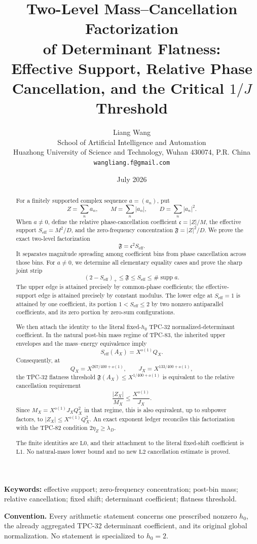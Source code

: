 \documentclass[11pt]{article}
\title{\textbf{Two-Level Mass--Cancellation Factorization}\\
of Determinant Flatness:\\
Effective Support, Relative Phase Cancellation,
and the Critical \(1/J\) Threshold}
\author{Liang Wang\\
School of Artificial Intelligence and Automation\\
Huazhong University of Science and Technology, Wuhan 430074, P.R. China\\
\texttt{wangliang.f@gmail.com}}
\date{July 2026}
\theoremstyle{definition}
\theoremstyle{remark}
\newcommand{\supp}{\operatorname{supp}}
\newcommand{\Seff}{S_{\mathrm{eff}}}
\newcommand{\canc}{\mathfrak c}
\newcommand{\Flat}{\mathfrak F}
\newcommand{\Lzero}{\mathrm{L0}}
\newcommand{\Lone}{\mathrm{L1}}
\newcommand{\Ltwo}{\mathrm{L2}}
\begin{document}
\maketitle

\begin{abstract}
For a finitely supported complex sequence \(a=(a_n)\), put
\[
 Z=\sum_na_n,\qquad
 M=\sum_n|a_n|,\qquad
 D=\sum_n|a_n|^2.
\]
When \(a\ne0\), define the relative phase-cancellation coefficient
\(\canc=|Z|/M\), the effective support
\(\Seff=M^2/D\), and the zero-frequency concentration
\(\Flat=|Z|^2/D\).  We prove the exact two-level factorization
\[
 \boxed{\Flat=\canc^2\Seff.}
\]
It separates magnitude spreading among coefficient bins from phase
cancellation across those bins.  For \(a\ne0\), we determine all
elementary equality cases and prove the sharp joint strip
\[
 (2-\Seff)_+\le \Flat\le \Seff\le\#\supp a.
\]
The upper edge is attained precisely by common-phase coefficients;
the effective-support edge is attained precisely by constant
modulus.  The lower edge at \(\Seff=1\) is attained by one
coefficient, its portion \(1<\Seff\le2\) by two nonzero antiparallel
coefficients, and its zero portion by zero-sum configurations.

We then attach the identity to the literal fixed-\(h_0\) TPC-32
normalized-determinant coefficient.  In the natural post-bin mass
regime of TPC-83, the inherited upper envelopes and the mass--energy
equivalence imply
\[
 \Seff(A_X)=X^{o(1)}Q_X.
\]
Consequently, at
\[
 Q_X=X^{267/400+o(1)},\qquad
 J_X=X^{133/400+o(1)},
\]
the TPC-32 flatness threshold
\(\Flat(A_X)\le X^{1/400+o(1)}\) is equivalent to the relative
cancellation requirement
\[
 \boxed{\frac{|Z_X|}{M_X}\le\frac{X^{o(1)}}{J_X}.}
\]
Since \(M_X=X^{o(1)}J_XQ_X^2\) in that regime, this is also
equivalent, up to subpower factors, to
\(|Z_X|\le X^{o(1)}Q_X^2\).
An exact exponent ledger reconciles this factorization with the
TPC-82 condition \(2\eta_Z\ge\lambda_D\).

The finite identities are \(\Lzero\), and their attachment to the
literal fixed-shift coefficient is \(\Lone\).  No natural-mass lower
bound and no new \(\Ltwo\) cancellation estimate is proved.
\end{abstract}

\noindent\textbf{Keywords:}
effective support; zero-frequency concentration; post-bin mass;
relative cancellation; fixed shift; determinant coefficient;
flatness threshold.

\medskip
\noindent\textbf{Convention.}
Every arithmetic statement concerns one prescribed nonzero
\(h_0\), the already aggregated TPC-32 determinant coefficient, and
its original global normalization.  No statement is specialized to
\(h_0=2\).









\begingroup
\raggedright


\endgroup
\end{document}
